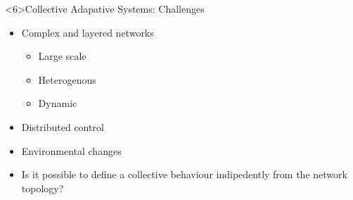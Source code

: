 \begin{frame}<6>{Collective Adapative Systems: Challenges}
  \begin{card}
    \begin{itemize}
      \item<1-> Complex and layered networks
      \begin{itemize}
        \item <2->Large scale
        \item <3->Heterogenous
        \item <4->Dynamic
      \end{itemize}
      \item<5-> Distributed control
      \item<6-> Environmental changes
    \end{itemize}
  \end{card}

  \begin{cardRed}
    \begin{itemize}
      \item Is it possible to define a collective behaviour indipedently from the network topology?
    \end{itemize}
  \end{cardRed}
\end{frame}